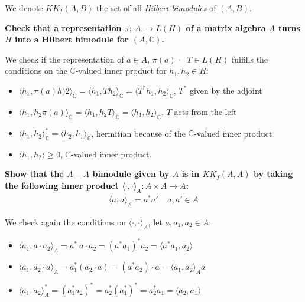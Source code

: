 \documentclass[a4paper]{article}
\newcounter{exercise}
\newenvironment{MyExercise}%
{\begin{mdframed}[style=exercisestyle]}{\end{mdframed}}
\theoremstyle{definition}
\theoremstyle{definition}
\theoremstyle{definition}
\theoremstyle{theorem}
\theoremstyle{theorem}
\begin{document}
We denote $KK_f(A,B)$ the set of all \textit{Hilbert bimodules} of $(A,B)$.

\begin{MyExercise}
    \textbf{
    Check that a representation $\pi:\ A \ \rightarrow L(H)$ of a matrix algebra $A$ turns $H$ into
    a Hilbert bimodule for $(A, \mathbb{C})$.
    \label{ex: bimodule}
}\newline


    We check if the representation of $a \in A$, $\pi(a)=T \in L(H)$ fulfills
    the conditions on the $\mathbb{C}$-valued inner product for $h_1, h_2 \in H$:
    \begin{itemize}
        \item $\langle h_1, \pi(a) h)2\rangle _\mathbb{C} = \langle h_1, T h_2\rangle _\mathbb{C} =
            \langle T^* h_1, h_2\rangle _\mathbb{C}$, $T^*$ given by the adjoint
        \item $\langle h_1, h_2 \pi(a)\rangle _\mathbb{C} = \langle h_1, h_2 T\rangle _\mathbb{C} = \langle h_1, h_2\rangle _\mathbb{C}$, $T$ acts from the left
        \item $\langle h_1, h_2\rangle _\mathbb{C}^* = \langle h_2,h_1\rangle _\mathbb{C}$, hermitian because of the
            $\mathbb{C}$-valued inner product
        \item $\langle h_1, h_2\rangle  \ge 0$, $\mathbb{C}$-valued inner product.
    \end{itemize}
\end{MyExercise}

\begin{MyExercise}
    \textbf{
    Show that the $A-A$ bimodule given by $A$ is in $KK_f(A,A)$ by taking the following inner product
    $\langle \cdot,\cdot\rangle_A:A \times A \rightarrow A$:
    \begin{align}
        \langle a, a\rangle_A = a^*a' \;\;\;\; a,a'\in A
    \end{align}
    \label{exercise: inner-product}
}\newline


    We check again the conditions on $\langle \cdot, \cdot\rangle _A$, let $a, a_1, a_2 \in A$:
    \begin{itemize}
        \item $\langle a_1, a\cdot a_2\rangle _A = a^*\ a\cdot a_2 = (a^*a_1)^* a_2 = \langle  a^*a_1, a_2\rangle  $
        \item $\langle a_1, a_2 \cdot a\rangle _A = a^*_1 (a_2\cdot a) = (a^*a_2)\cdot a = \langle a_1, a_2\rangle _A a$
        \item $\langle a_1, a_2\rangle _A^* = (a_1^* a_2)^* = a_2^*(a_1^*)^* = a_2^* a_1 = \langle a_2, a_1\rangle $
    \end{itemize}
\end{MyExercise}
\end{document}
